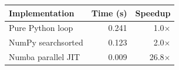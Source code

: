 \begin{tabular}{lrr}
\toprule
Implementation & Time (s) & Speedup \\
\midrule
Pure Python loop & 0.241 & 1.0$\times$ \\
NumPy searchsorted & 0.123 & 2.0$\times$ \\
Numba parallel JIT & 0.009 & 26.8$\times$ \\
\bottomrule
\end{tabular}